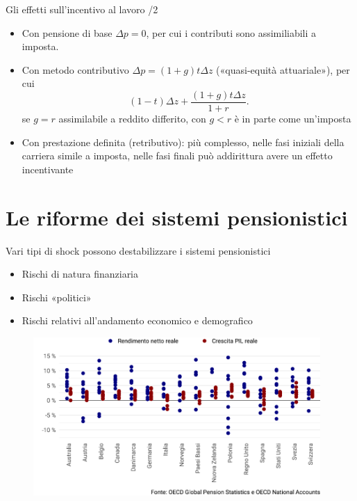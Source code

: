 \documentclass[11pt]{beamer}
\begin{document}
\begin{frame}{Gli effetti sull'incentivo al lavoro /2}
\begin{itemize}
\item Con pensione di base \(\Delta p=0\), per cui i contributi sono assimiliabili a
imposta.
\item Con metodo contributivo \(\Delta p = (1+g)t\Delta z\) («quasi-equità
attuariale»), per cui
\begin{equation*}
  (1-t)\Delta z +\frac{(1+g)t\Delta z}{1+r}.
\end{equation*}
se \(g=r\) assimilabile a reddito differito, con \(g<r\) è in parte come
un'imposta
\item Con prestazione definita (retributivo): più complesso, nelle fasi iniziali
della carriera simile a imposta, nelle fasi finali può addirittura avere un
effetto incentivante
\end{itemize}
\end{frame}


\section{Le riforme dei sistemi pensionistici}

\begin{frame}{Vari tipi di shock possono destabilizzare i sistemi pensionistici}
\begin{itemize}
\item Rischi di natura finanziaria
\item Rischi «politici»
\item Rischi relativi all'andamento economico e demografico
\end{itemize}

\begin{figure}[htbp]
\centering
\includegraphics[height=6cm]{./figure/crescita-e-rendimenti-2010-2019-color.pdf}
\end{figure}
\end{frame}
\end{document}
